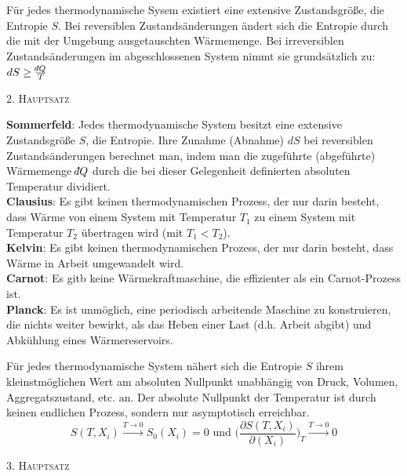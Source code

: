 \documentclass[12pt,a4paper, twoside]{article}
\renewcommand{\=}[1]{\stackrel{#1}{=}}
\def\dbar{{\mathchar'26\mkern-12mu d}}
\def\dbar{{\mathchar'26\mkern-12mu d}}
\theoremstyle{definition}
\theoremstyle{remark}
\begin{document}
\begin{center}
\begin{framed} \noindent Für jedes thermodynamische Sysem existiert eine extensive Zustandsgröße, die Entropie $S$. Bei reversiblen Zustandsänderungen ändert sich die Entropie durch die mit der Umgebung ausgetauschten Wärmemenge. Bei irreversiblen Zustandsänderungen im abgeschlossenen System nimmt sie grundsätzlich zu: $dS \geq \frac{\dbar Q}{T}$
\begin{center}\textsc{2. Hauptsatz}\end{center}\end{framed}
\end{center}

\begin{center}
\begin{framed}
\noindent \textbf{Sommerfeld}: Jedes thermodynamische System besitzt eine extensive Zustandsgröße $S$, die Entropie. Ihre Zunahme (Abnahme) $dS$ bei reversiblen Zustandsänderungen berechnet man, indem man die zugeführte (abgeführte) Wärmemenge $\dbar Q$ durch die bei dieser Gelegenheit definierten absoluten Temperatur dividiert.\\
\noindent \textbf{Clausius}: Es gibt keinen thermodynamischen Prozess, der nur darin besteht, dass Wärme von einem System mit Temperatur $T_1$ zu einem System mit Temperatur $T_2$ übertragen wird (mit $T_1 < T_2$).\\
\noindent \textbf{Kelvin}: Es gibt keinen thermodynamischen Prozess, der nur darin besteht, dass Wärme in Arbeit umgewandelt wird.\\
\noindent \textbf{Carnot}: Es gitb keine Wärmekraftmaschine, die effizienter als ein Carnot-Prozess ist.\\
\noindent \textbf{Planck}: Es ist unmöglich, eine periodisch arbeitende Maschine zu konstruieren, die nichts weiter bewirkt, als das Heben einer Last (d.h. Arbeit abgibt) und Abkühlung eines Wärmereservoirs.
\end{framed}
\end{center}

\begin{center}
\begin{framed} \noindent Für jedes thermodynamische System nähert sich die Entropie $S$ ihrem kleinstmöglichen Wert am absoluten Nullpunkt unabhängig von Druck, Volumen, Aggregatszustand, etc. an.
Der absolute Nullpunkt der Temperatur ist durch keinen endlichen Prozess, sondern nur asymptotisch erreichbar.
$$S(T,X_i) \xrightarrow{T \rightarrow 0} S_0(X_i) = 0 \text{ und } \Big(\frac{\partial S(T,X_i)}{\partial(X_i)}\Big)_T \xrightarrow{T \rightarrow 0} 0$$
\begin{center}\textsc{3. Hauptsatz}\end{center}\end{framed}
\end{center}
\end{document}
